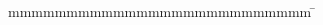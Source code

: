 
\begin{titlepage}
	\begin{longtable}{p{8.2cm} p{5.4cm}}
	\end{longtable}

	\enlargethispage{20mm}
	\begin{center}
		\vspace*{12mm}	{\LARGE\textbf \titel }\\
		\vspace*{12mm}	{\large\textbf \arbeit}\\
		\vspace*{12mm}	\langdeckblattabschlusshinleitung\\
		\vspace*{3mm}		{\textbf \abschluss}\\
		\vspace*{12mm}	\langartikelstudiengang{} \langstudiengang{} \studiengang\\
		\vspace*{3mm}		\langanderdh{} \dhbw\\
		\vspace*{12mm}	\langvon\\
		\vspace*{3mm}		{\large\textbf \autor}\\
		\vspace*{12mm}	\datumAbgabe\\
		\vspace*{12mm}
	\end{center}
	\vfill
	\begin{spacing}{1.2}
		\begin{tabbing}
			mmmmmmmmmmmmmmmmmmmmmmmmmm             \= \kill
			\textbf{\langdbbearbeitungszeit}       \>  \zeitraum\\
			\textbf{\langdbmatriknr}               \>  \martrikelnr\\
			\textbf{\langdbgutachter}              \>  \gutachter
		\end{tabbing}
	\end{spacing}
\end{titlepage}
